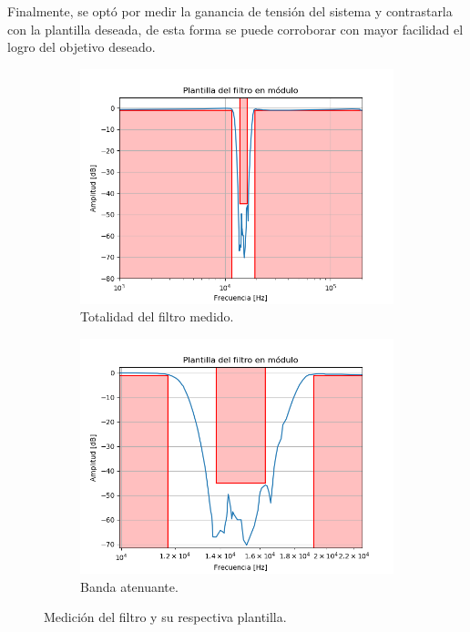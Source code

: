 Finalmente, se optó por medir la ganancia de tensión del sistema y contrastarla con la plantilla deseada, de esta forma se puede corroborar con mayor facilidad el logro del objetivo deseado.
\begin{figure}[H]
\centering
\begin{subfigure}{.7\textwidth}
\centering
	\includegraphics[width=\textwidth]{Imagenes/Mod-Plantilla-1.png}
	\caption{Totalidad del filtro medido.}
	\label{fig:filtro1}
\end{subfigure}
\centering
\begin{subfigure}{.7\textwidth}
\centering
	\includegraphics[width=\textwidth]{Imagenes/Mod-Plantilla-2.png}
	\caption{Banda atenuante.}
	\label{fig:filtro2}
\end{subfigure}
\caption{Medición del filtro y su respectiva plantilla.}
\label{fig:filtro}
\end{figure}

